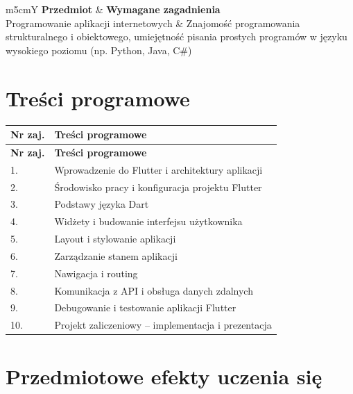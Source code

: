 \documentclass[12pt, a4paper]{article}
\newcommand{\thdrule}{\noalign{\global\setlength{\extrarowheight}{0pt}}}
\newcommand{\thdend}{\noalign{\global\setlength{\extrarowheight}{3pt}}}
\begin{document}
{\scriptsize
\begin{tabularx}{\textwidth}{m{5cm}Y}
\thdrule\toprule
{} {\color{white}\textbf{Przedmiot}} & {\color{white}\textbf{Wymagane zagadnienia}} \\
\midrule\thdend
   Programowanie aplikacji internetowych & Znajomość programowania strukturalnego i obiektowego, umiejętność pisania prostych programów w języku wysokiego poziomu (np. Python, Java, C\#) \\
\bottomrule
\end{tabularx}}

\section{Treści programowe}

{\scriptsize
\begin{longtable}{m{1.5cm}m{14.5cm}}
\thdrule\toprule
\rowcolor{pjatkRed} {\color{white}\textbf{Nr zaj.}} & {\color{white}\textbf{Treści programowe}} \\
\midrule\thdend
\endfirsthead
\thdrule\toprule
\rowcolor{pjatkRed} {\color{white}\textbf{Nr zaj.}} & {\color{white}\textbf{Treści programowe}} \\
\midrule\thdend
\endhead
  \rowcolor{tableRowLight} 1. & Wprowadzenie do Flutter i architektury aplikacji \\
  \rowcolor{tableRowAlt} 2. & Środowisko pracy i konfiguracja projektu Flutter \\
  \rowcolor{tableRowLight} 3. & Podstawy języka Dart \\
  \rowcolor{tableRowAlt} 4. & Widżety i budowanie interfejsu użytkownika \\
  \rowcolor{tableRowLight} 5. & Layout i stylowanie aplikacji \\
  \rowcolor{tableRowAlt} 6. & Zarządzanie stanem aplikacji \\
  \rowcolor{tableRowLight} 7. & Nawigacja i routing \\
  \rowcolor{tableRowAlt} 8. & Komunikacja z API i obsługa danych zdalnych \\
  \rowcolor{tableRowLight} 9. & Debugowanie i testowanie aplikacji Flutter \\
  \rowcolor{tableRowAlt} 10. & Projekt zaliczeniowy – implementacja i prezentacja \\
\bottomrule
\end{longtable}}

\section{Przedmiotowe efekty uczenia się}
\end{document}
